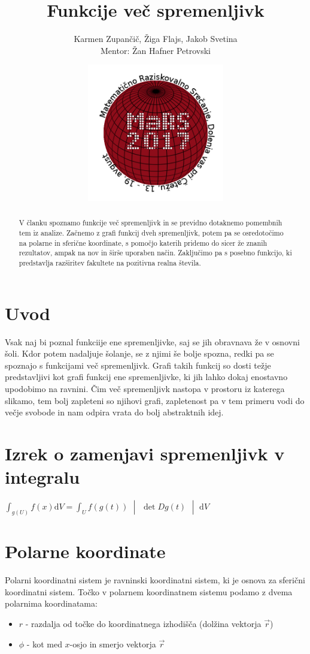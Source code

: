 \documentclass[12pt, a4paper]{article}
\title{Funkcije več spremenljivk}
\author{Karmen Zupančič, Žiga Flajs, Jakob Svetina \\ Mentor: Žan Hafner Petrovski}
\date{\includegraphics[width = 6cm]{logo_MaRS2017.png}}
\begin{document}
\maketitle

\begin{abstract}
V članku spoznamo funkcije več spremenljivk in se previdno dotaknemo pomembnih tem iz analize. Začnemo z grafi funkcij dveh spremenljivk, potem pa se osredotočimo na polarne in sferične koordinate, s pomočjo katerih pridemo do sicer že znanih rezultatov, ampak na nov in širše uporaben način. Zaključimo pa s posebno funkcijo, ki predstavlja razširitev fakultete na pozitivna realna števila.
\end{abstract}

\section{Uvod}
Vsak naj bi poznal funkciije ene spremenljivke, saj se jih obravnava že v osnovni šoli. Kdor potem nadaljuje šolanje, se z njimi še bolje spozna, redki pa se spoznajo s funkcijami več spremenljivk. Grafi takih funkcij so dosti težje predstavljivi kot grafi funkcij ene spremenljivke, ki jih lahko dokaj enostavno upodobimo na ravnini. Čim več spremenljivk nastopa v prostoru iz katerega slikamo, tem bolj zapleteni so njihovi grafi, zapletenost pa v tem primeru vodi do večje svobode in nam odpira vrata do bolj abstraktnih idej.


\section{Izrek o zamenjavi spremenljivk v integralu}

$ \int^{}_{g(U)}f(x) \mathrm{d} V =  \int^{}_{U}f(g(t)) $ $ \begin{vmatrix} \det Dg(t) \end{vmatrix} $ $ \mathrm{d} V $

\section{Polarne koordinate}
Polarni koordinatni sistem je ravninski koordinatni sistem, ki je osnova za sferični koordinatni sistem. Točko v polarnem koordinatnem sistemu podamo z dvema polarnima koordinatama:
\begin{itemize}
\item $r$ - razdalja od točke do koordinatnega izhodišča (dolžina vektorja $\vec{r}$)
\item $\phi$ - kot med $x$-osjo in smerjo vektorja $\vec{r}$
\end{itemize}
\end{document}
